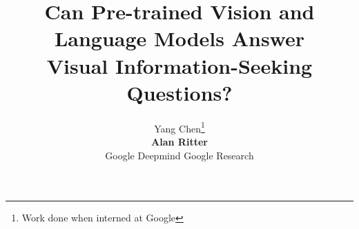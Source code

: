 \documentclass[11pt]{article}
\title{Can Pre-trained Vision and Language Models Answer \\ Visual Information-Seeking Questions?}
\author{
{Yang Chen}\thanks{\quad Work done when interned at Google}\quad {Hexiang Hu}\quad {Yi Luan}\quad {Haitian Sun} \quad {Soravit Changpinyo} \quad \\
{\textbf{Alan Ritter}} \quad {\textbf{Ming-Wei Chang}} \\
\xspace {Google Deepmind} \quad
\xspace {Google Research} \quad\xspace {Georgia Institute of Technology}
}
\begin{document}
\clearpage{}

\newcommand{\backup}[1]{{}}
\newcommand{\nlp}[1]{\texttt{\small #1}}
\newcommand{\snlp}[1]{\texttt{\small #1}}
\newcommand{\entity}[1]{\texttt{\textsc{\small #1}}}




\newcommand{\frank}[1]{{\color{brown}Frank: #1}\xspace}
\newcommand{\yi}[1]{{\color{purple}Yi: #1}\xspace}
\newcommand{\mw}[1]{{\color{blue}Ming-Wei: #1}\xspace}
\newcommand{\yc}[1]{{\color{red}Yang: #1}\xspace}
\newcommand{\ar}[1]{{\color{green}Alan: #1}\xspace}
\newcommand{\beer}[1]{{\color{orange}Beer: #1}\xspace}

\newcommand{\ie}{\textit{i.e}}
\newcommand{\eg}{{\small e.g.}}
\newcommand\mypara[1]{\vspace{1mm}\noindent\textbf{#1}}

\newcommand{\ourdataset}{\textsc{InfoSeek}\xspace}
\newcommand{\infoseek}{\ourdataset}
\newcommand{\palift}{PaLI\xspace}
\newcommand{\ofaft}{OFA\xspace}

\newcommand{\qonly}{PaLM (Q-only)\xspace}




\newcommand{\seen}[0]{{\textsc{Seen}}\xspace}
\newcommand{\unseen}[0]{{\textsc{Unseen}}\xspace}
\newcommand{\nokb}[0]{{\textbf{No-KB}}\xspace}
\newcommand{\withkb}[0]{{\textbf{With-KB}}\xspace}

\newcommand{\pd}{\hphantom{.}}
\newcommand{\pz}{\hphantom{0}}
\newcommand{\pzz}{\hphantom{00}}


\newcommand{\custompara}[1]{{\vspace{1mm}\noindent\textbf{#1}\xspace}}
\newcommand{\entgen}[0]{\textsc{EntGen}\space}
\newcommand{\entret}[0]{\textsc{EntRet}\space}

\newcommand*{\ClipSep}{0.1cm}
\end{document}
